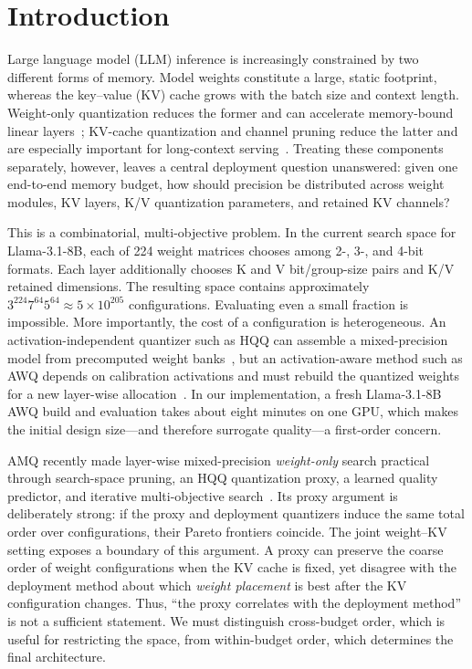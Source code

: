 \section{Introduction}
\label{sec:intro}

Large language model (LLM) inference is increasingly constrained by two
different forms of memory.  Model weights constitute a large, static footprint,
whereas the key--value (KV) cache grows with the batch size and context length.
Weight-only quantization reduces the former and can accelerate memory-bound
linear layers~\citep{frantar2023gptq,lin2024awq}; KV-cache quantization and
channel pruning reduce the latter and are especially important for long-context
serving~\citep{liu2024kivi,xu2025think}.  Treating these components separately,
however, leaves a central deployment question unanswered: given one end-to-end
memory budget, how should precision be distributed across weight modules, KV
layers, K/V quantization parameters, and retained KV channels?

This is a combinatorial, multi-objective problem.  In the current search space
for Llama-3.1-8B, each of 224 weight matrices chooses among 2-, 3-, and 4-bit
formats.  Each layer additionally chooses K and V bit/group-size pairs and K/V
retained dimensions.  The resulting space contains approximately
$3^{224}7^{64}5^{64}\approx 5\times10^{205}$ configurations.  Evaluating even a
small fraction is impossible.  More importantly, the cost of a configuration is
heterogeneous.  An activation-independent quantizer such as HQQ can assemble a
mixed-precision model from precomputed weight banks~\citep{badri2023hqq}, but an
activation-aware method such as AWQ depends on calibration activations and must
rebuild the quantized weights for a new layer-wise allocation~\citep{lin2024awq}.
In our implementation, a fresh Llama-3.1-8B AWQ build and evaluation takes about
eight minutes on one GPU, which makes the initial design size---and therefore
surrogate quality---a first-order concern.

AMQ recently made layer-wise mixed-precision \emph{weight-only} search practical
through search-space pruning, an HQQ quantization proxy, a learned quality
predictor, and iterative multi-objective search~\citep{lee2025amq}.  Its proxy
argument is deliberately strong: if the proxy and deployment quantizers induce
the same total order over configurations, their Pareto frontiers coincide.  The
joint weight--KV setting exposes a boundary of this argument.  A proxy can
preserve the coarse order of weight configurations when the KV cache is fixed,
yet disagree with the deployment method about which \emph{weight placement} is
best after the KV configuration changes.  Thus, ``the proxy correlates with the
deployment method'' is not a sufficient statement.  We must distinguish
cross-budget order, which is useful for restricting the space, from
within-budget order, which determines the final architecture.

